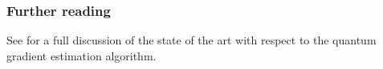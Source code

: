 \begin{refsection}

\subsubsection*{Further reading}

See \cite{gilyen2017OptQOptAlgGrad} for a full discussion of the state of the art with respect to the quantum gradient estimation algorithm. 

\printbibliography[heading=secbib,segment=\therefsegment]

\end{refsection}
